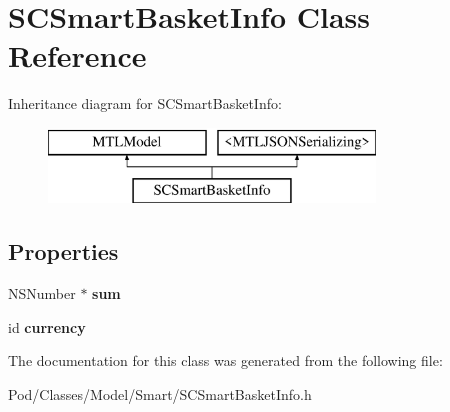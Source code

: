 \hypertarget{interface_s_c_smart_basket_info}{}\section{S\+C\+Smart\+Basket\+Info Class Reference}
\label{interface_s_c_smart_basket_info}
Inheritance diagram for S\+C\+Smart\+Basket\+Info\+:\begin{figure}[H]
\begin{center}
\leavevmode
\includegraphics[height=2.000000cm]{interface_s_c_smart_basket_info}
\end{center}
\end{figure}
\subsection*{Properties}
\begin{DoxyCompactItemize}
\item 
N\+S\+Number $\ast$ {\bfseries sum}\hypertarget{interface_s_c_smart_basket_info_a4db665e4ea40c880ed5817e2fa199cb9}{}\label{interface_s_c_smart_basket_info_a4db665e4ea40c880ed5817e2fa199cb9}

\item 
id {\bfseries currency}\hypertarget{interface_s_c_smart_basket_info_abc5b45c7d44addd1a7f9c4d34f463041}{}\label{interface_s_c_smart_basket_info_abc5b45c7d44addd1a7f9c4d34f463041}

\end{DoxyCompactItemize}


The documentation for this class was generated from the following file\+:\begin{DoxyCompactItemize}
\item 
Pod/\+Classes/\+Model/\+Smart/S\+C\+Smart\+Basket\+Info.\+h\end{DoxyCompactItemize}
